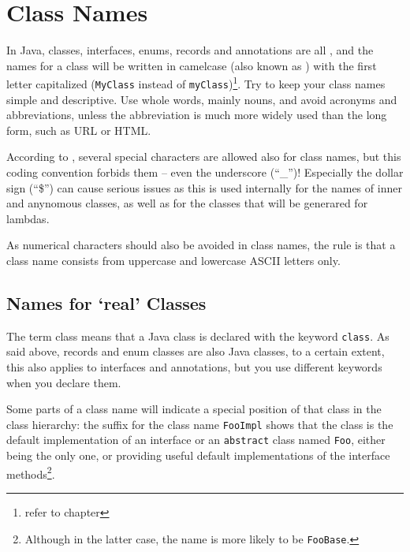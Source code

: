 \section{Class Names}\label{sec:Classes}
In Java, classes, interfaces, enums, records and annotations are all , and the names for a class will be written in camelcase (also known as ) with the first letter capitalized (\lstinline|MyClass| instead of \lstinline|myClass|)\footnote{refer to chapter }. Try to keep your class names simple and descriptive. Use whole words, mainly nouns, and avoid acronyms and abbreviations, unless the abbreviation is much more widely used than the long form, such as URL or HTML.

According to \jls \autocite{ORACLE_DOC_LANGUAGE_SPECIFICATION:Identifiers}, several special characters are allowed also for class names, but this coding convention forbids them – even the underscore (“\_”)! Especially the dollar sign (“\$”) can cause serious issues as this is used internally for the names of inner and anynomous classes, as well as for the classes that will be generared for lambdas.

As numerical characters should also be avoided in class names, the rule is that a class name consists from uppercase and lowercase ASCII letters only.


\subsection{Names for ‘real’ Classes}\label{sec:NamesForClasses}
The term  class means that a Java class is declared with the keyword \lstinline|class|. As said above, records and enum classes are also Java classes, to a certain extent, this also applies to interfaces and annotations, but you use different keywords when you declare them.

Some parts of a class name will indicate a special position of that class in the class hierarchy: the suffix  for the class name \lstinline|FooImpl| shows that the class is the default implementation of an interface or an \lstinline|abstract| class named \lstinline|Foo|, either being the only one, or providing useful default implementations of the interface methods\footnote{Although in the latter case, the name is more likely to be \lstinline|FooBase|.}.

